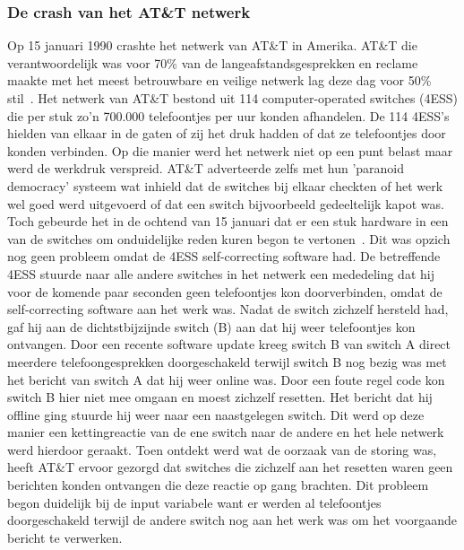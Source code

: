 \documentclass{article}
\begin{document}
\subsubsection{De crash van het AT\&T netwerk}
Op 15 januari 1990 crashte het netwerk van AT\&T in Amerika. AT\&T die verantwoordelijk was voor 70\% van de langeafstandsgesprekken en reclame maakte met het meest betrouwbare en veilige netwerk lag deze dag voor 50\% stil~\cite{allcircuits}. Het netwerk van AT\&T bestond uit 114 computer-operated switches (4ESS) die per stuk zo'n 700.000 telefoontjes per uur konden afhandelen. De 114 4ESS's hielden van elkaar in de gaten of zij het druk hadden of dat ze telefoontjes door konden verbinden. Op die manier werd het netwerk niet op een punt belast maar werd de werkdruk verspreid. AT\&T adverteerde zelfs met hun 'paranoid democracy' systeem wat inhield dat de switches bij elkaar checkten of het werk wel goed werd uitgevoerd of dat een switch bijvoorbeeld gedeeltelijk kapot was. Toch gebeurde het in de ochtend van 15 januari dat er een stuk hardware in een van de switches om onduidelijke reden kuren begon te vertonen~\cite{networkfailure}. Dit was opzich nog geen probleem omdat de 4ESS self-correcting software had. De betreffende 4ESS stuurde naar alle andere switches in het netwerk een mededeling dat hij voor de komende paar seconden geen telefoontjes kon doorverbinden, omdat de self-correcting software aan het werk was. Nadat de switch zichzelf hersteld had, gaf hij aan de dichtstbijzijnde switch (B) aan dat hij weer telefoontjes kon ontvangen. Door een recente software update kreeg switch B van switch A direct meerdere telefoongesprekken doorgeschakeld terwijl switch B nog bezig was met het bericht van switch A dat hij weer online was. Door een foute regel code kon switch B hier niet mee omgaan en moest zichzelf resetten. Het bericht dat hij offline ging stuurde hij weer naar een naastgelegen switch. Dit werd op deze manier een kettingreactie van de ene switch naar de andere en het hele netwerk werd hierdoor geraakt. Toen ontdekt werd wat de oorzaak van de storing was, heeft AT\&T ervoor gezorgd dat switches die zichzelf aan het resetten waren geen berichten konden ontvangen die deze reactie op gang brachten. Dit probleem begon duidelijk bij de input variabele want er werden al telefoontjes doorgeschakeld terwijl de andere switch nog aan het werk was om het voorgaande bericht te verwerken.
\end{document}
